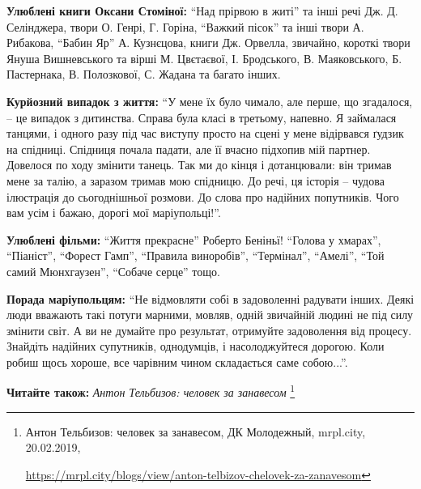 
\textbf{Улюблені книги Оксани Стоміної:} \enquote{Над прірвою в житі} та інші речі Дж. Д.
Селінджера, твори О. Генрі, Г. Горіна, \enquote{Важкий пісок} та інші твори А.
Рибакова, \enquote{Бабин Яр} А. Кузнєцова, книги Дж. Орвелла, звичайно, короткі твори
Януша Вишневського та вірші М. Цвєтаєвої, І. Бродського, В. Маяковського, Б.
Пастернака, В. Полозкової, С. Жадана та багато інших.

\textbf{Курйозний випадок з життя:} \enquote{У мене їх було чимало, але перше, що згадалося, –
це випадок з дитинства. Справа була класі в третьому, напевно. Я займалася
танцями, і одного разу під час виступу просто на сцені у мене відірвався ґудзик
на спідниці. Спідниця почала падати, але її вчасно підхопив мій партнер.
Довелося по ходу змінити танець. Так ми до кінця і дотанцювали: він тримав мене
за талію, а заразом тримав мою спідницю. До речі, ця історія – чудова
ілюстрація до сьогоднішньої розмови. До слова про надійних попутників. Чого вам
усім і бажаю, дорогі мої маріупольці!}.

\textbf{Улюблені фільми:} \enquote{Життя прекрасне} Роберто Беніньї! \enquote{Голова у хмарах},
\enquote{Піаніст}, \enquote{Форест Гамп}, \enquote{Правила виноробів}, \enquote{Термінал}, \enquote{Амелі}, \enquote{Той самий
Мюнхгаузен}, \enquote{Собаче серце} тощо.

\textbf{Порада маріупольцям:} \enquote{Не відмовляти собі в задоволенні радувати інших.
Деякі люди вважають такі потуги марними, мовляв, одній звичайній людині не під
силу змінити світ. А ви не думайте про результат, отримуйте задоволення від
процесу. Знайдіть надійних супутників, однодумців, і насолоджуйтеся дорогою.
Коли робиш щось хороше, все чарівним чином складається саме собою...}.

\textbf{Читайте також:} \emph{Антон Тельбизов: человек за занавесом}%
\footnote{Антон Тельбизов: человек за занавесом, ДК Молодежный, mrpl.city, 20.02.2019, \par%
\url{https://mrpl.city/blogs/view/anton-telbizov-chelovek-za-zanavesom}
}
